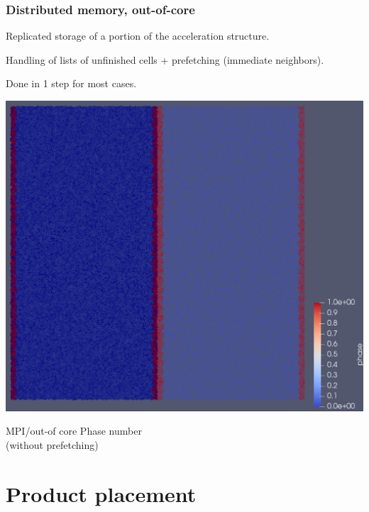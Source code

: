 \documentclass[aspectratio=169]{beamer}
\begin{document}
\begin{frame}
    \frametitle{Distributed memory, out-of-core}

    \begin{minipage}[c][0.6\textheight][c]{0.5\textwidth}
        Replicated storage of a portion of the acceleration structure.

        \bigskip
        Handling of lists of unfinished cells + prefetching (immediate neighbors).

        \vfill
        Done in 1 step for most cases.
    \end{minipage}
    \textwidth 
    \begin{minipage}[c][0.6\textheight][c]{0.4\textwidth}
        \begin{center}
            \includegraphics[width=\textwidth]{img/mpi.png}
            
            MPI/out-of core Phase number \\ (without prefetching)
        \end{center}
    \end{minipage}
\end{frame}


\section{Product placement}
\end{document}
